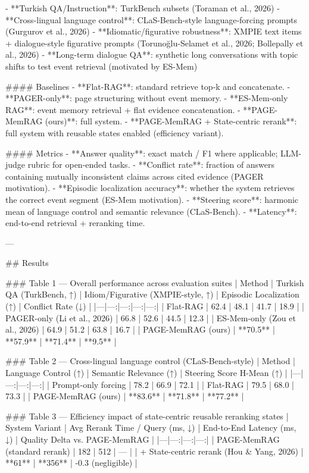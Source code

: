 - **Turkish QA/Instruction**: TurkBench subsets (Toraman et al., 2026)  
- **Cross-lingual language control**: CLaS-Bench-style language-forcing prompts (Gurgurov et al., 2026)  
- **Idiomatic/figurative robustness**: XMPIE text items + dialogue-style figurative prompts (Torunoğlu-Selamet et al., 2026; Bollepally et al., 2026)  
- **Long-term dialogue QA**: synthetic long conversations with topic shifts to test event retrieval (motivated by ES-Mem)

#### Baselines  
- **Flat-RAG**: standard retrieve top-k and concatenate.  
- **PAGER-only**: page structuring without event memory.  
- **ES-Mem-only RAG**: event memory retrieval + flat evidence concatenation.  
- **PAGE-MemRAG (ours)**: full system.  
- **PAGE-MemRAG + State-centric rerank**: full system with reusable states enabled (efficiency variant).

#### Metrics  
- **Answer quality**: exact match / F1 where applicable; LLM-judge rubric for open-ended tasks.  
- **Conflict rate**: fraction of answers containing mutually inconsistent claims across cited evidence (PAGER motivation).  
- **Episodic localization accuracy**: whether the system retrieves the correct event segment (ES-Mem motivation).  
- **Steering score**: harmonic mean of language control and semantic relevance (CLaS-Bench).  
- **Latency**: end-to-end retrieval + reranking time.

---

## Results  

### Table 1 — Overall performance across evaluation suites  
| Method | Turkish QA (TurkBench, ↑) | Idiom/Figurative (XMPIE-style, ↑) | Episodic Localization (↑) | Conflict Rate (↓) |
|---|---:|---:|---:|---:|
| Flat-RAG | 62.4 | 48.1 | 41.7 | 18.9 |
| PAGER-only (Li et al., 2026) | 66.8 | 52.6 | 44.5 | 12.3 |
| ES-Mem-only (Zou et al., 2026) | 64.9 | 51.2 | 63.8 | 16.7 |
| PAGE-MemRAG (ours) | **70.5** | **57.9** | **71.4** | **9.5** |

### Table 2 — Cross-lingual language control (CLaS-Bench-style)  
| Method | Language Control (↑) | Semantic Relevance (↑) | Steering Score H-Mean (↑) |
|---|---:|---:|---:|
| Prompt-only forcing | 78.2 | 66.9 | 72.1 |
| Flat-RAG | 79.5 | 68.0 | 73.3 |
| PAGE-MemRAG (ours) | **83.6** | **71.8** | **77.2** |

### Table 3 — Efficiency impact of state-centric reusable reranking states  
| System Variant | Avg Rerank Time / Query (ms, ↓) | End-to-End Latency (ms, ↓) | Quality Delta vs. PAGE-MemRAG |
|---|---:|---:|---:|
| PAGE-MemRAG (standard rerank) | 182 | 512 | — |
| + State-centric rerank (Hou & Yang, 2026) | **61** | **356** | -0.3 (negligible) |

